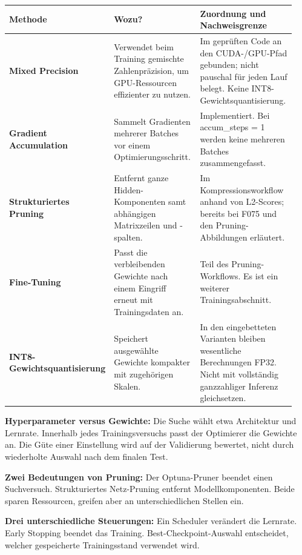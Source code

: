\clearpage
{}
\begingroup\footnotesize\setlength{\tabcolsep}{4pt}\renewcommand{\arraystretch}{1.08}
\begin{longtable}{@{}p{0.20\linewidth}p{0.34\linewidth}p{0.40\linewidth}@{}}\toprule\textbf{Methode} & \textbf{Wozu?} & \textbf{Zuordnung und Nachweisgrenze}\\\midrule\endhead
\textbf{Mixed Precision} & Verwendet beim Training gemischte Zahlenpräzision, um GPU-Ressourcen effizienter zu nutzen. & Im geprüften Code an den CUDA-/GPU-Pfad gebunden; nicht pauschal für jeden Lauf belegt. Keine INT8-Gewichtsquantisierung.\\[5pt]\midrule
\textbf{Gradient Accumulation} & Sammelt Gradienten mehrerer Batches vor einem Optimierungsschritt. & Implementiert. Bei accum\_steps = 1 werden keine mehreren Batches zusammengefasst.\\[5pt]\midrule
\textbf{Strukturiertes Pruning} & Entfernt ganze Hidden-Komponenten samt abhängigen Matrixzeilen und -spalten. & Im Kompressionsworkflow anhand von L2-Scores; bereits bei F075 und den Pruning-Abbildungen erläutert.\\[5pt]\midrule
\textbf{Fine-Tuning} & Passt die verbleibenden Gewichte nach einem Eingriff erneut mit Trainingsdaten an. & Teil des Pruning-Workflows. Es ist ein weiterer Trainingsabschnitt.\\[5pt]\midrule
\textbf{INT8-Gewichtsquantisierung} & Speichert ausgewählte Gewichte kompakter mit zugehörigen Skalen. & In den eingebetteten Varianten bleiben wesentliche Berechnungen FP32. Nicht mit vollständig ganzzahliger Inferenz gleichsetzen.\\[5pt]\midrule
\end{longtable}\endgroup

\textbf{Hyperparameter versus Gewichte:} Die Suche wählt etwa Architektur und Lernrate. Innerhalb jedes Trainingsversuchs passt der Optimierer die Gewichte an. Die Güte einer Einstellung wird auf der Validierung bewertet, nicht durch wiederholte Auswahl nach dem finalen Test.

\textbf{Zwei Bedeutungen von Pruning:} Der Optuna-Pruner beendet einen Suchversuch. Strukturiertes Netz-Pruning entfernt Modellkomponenten. Beide sparen Ressourcen, greifen aber an unterschiedlichen Stellen ein.

\textbf{Drei unterschiedliche Steuerungen:} Ein Scheduler verändert die Lernrate. Early Stopping beendet das Training. Best-Checkpoint-Auswahl entscheidet, welcher gespeicherte Trainingsstand verwendet wird.

